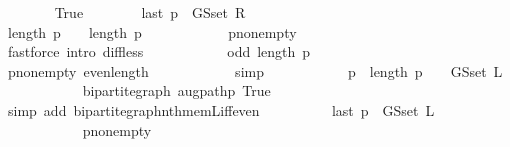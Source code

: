 \begin{isabellebody}
\ \ \ \ \ \ \isamarkupfalse%
\ True\isanewline
\ \ \ \ \ \ \isamarkupfalse%
\ {\isachardoublequoteopen}last\ p\ {\isasymin}\ G{\isachardot}{\kern0pt}S{\isachardot}{\kern0pt}set\ R{\isachardoublequoteclose}\isanewline
\ \ \ \ \ \ \isamarkupfalse%
\ {\isacharminus}{\kern0pt}\isanewline
\ \ \ \ \ \ \ \ \isamarkupfalse%
\ {\isachardoublequoteopen}length\ p\ {\isacharminus}{\kern0pt}\ {}\ {\isacharless}{\kern0pt}\ length\ p{\isachardoublequoteclose}\isanewline
\ \ \ \ \ \ \ \ \ \ \isamarkupfalse%
\ p{\isacharunderscore}{\kern0pt}non{\isacharunderscore}{\kern0pt}empty\isanewline
\ \ \ \ \ \ \ \ \ \ \isamarkupfalse%
\ {\isacharparenleft}{\kern0pt}fastforce\ intro{\isacharcolon}{\kern0pt}\ diff{\isacharunderscore}{\kern0pt}less{\isacharparenright}{\kern0pt}\isanewline
\ \ \ \ \ \ \ \ \isamarkupfalse%
\ \isamarkupfalse%
\ {\isachardoublequoteopen}odd\ {\isacharparenleft}{\kern0pt}length\ p\ {\isacharminus}{\kern0pt}\ {}{\isacharparenright}{\kern0pt}{\isachardoublequoteclose}\isanewline
\ \ \ \ \ \ \ \ \ \ \isamarkupfalse%
\ p{\isacharunderscore}{\kern0pt}non{\isacharunderscore}{\kern0pt}empty\ even{\isacharunderscore}{\kern0pt}length\isanewline
\ \ \ \ \ \ \ \ \ \ \isamarkupfalse%
\ simp\isanewline
\ \ \ \ \ \ \ \ \isamarkupfalse%
\ \isamarkupfalse%
\ {\isachardoublequoteopen}p\ {\isacharbang}{\kern0pt}\ {\isacharparenleft}{\kern0pt}length\ p\ {\isacharminus}{\kern0pt}\ {}{\isacharparenright}{\kern0pt}\ {\isasymnotin}\ G{\isachardot}{\kern0pt}S{\isachardot}{\kern0pt}set\ L{\isachardoublequoteclose}\isanewline
\ \ \ \ \ \ \ \ \ \ \isamarkupfalse%
\ bipartite{\isacharunderscore}{\kern0pt}graph\ augpath{\isacharunderscore}{\kern0pt}p\ True\isanewline
\ \ \ \ \ \ \ \ \ \ \isamarkupfalse%
\ {\isacharparenleft}{\kern0pt}simp\ add{\isacharcolon}{\kern0pt}\ bipartite{\isacharunderscore}{\kern0pt}graph{\isachardot}{\kern0pt}nth{\isacharunderscore}{\kern0pt}mem{\isacharunderscore}{\kern0pt}L{\isacharunderscore}{\kern0pt}iff{\isacharunderscore}{\kern0pt}even{\isacharparenright}{\kern0pt}\isanewline
\ \ \ \ \ \ \ \ \isamarkupfalse%
\ {\isachardoublequoteopen}last\ p\ {\isasymnotin}\ G{\isachardot}{\kern0pt}S{\isachardot}{\kern0pt}set\ L{\isachardoublequoteclose}\isanewline
\ \ \ \ \ \ \ \ \ \ \isamarkupfalse%
\ p{\isacharunderscore}{\kern0pt}non{\isacharunderscore}{\kern0pt}empty\isanewline

\end{isabellebody}
